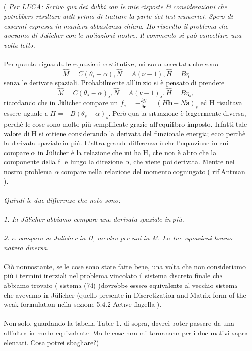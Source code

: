 \\\\\\\\
( \emph{Per LUCA: Scrivo qua dei dubbi con le mie risposte & considerazioni che potrebbero risultare utili prima di trattare la parte dei test numerici. Spero di essermi espressa in maniera abbastanza chiara. Ho riscritto il problema che avevamo di Julicher con le notiazioni nostre.
Il commento si può cancellare una volta letto.}
\\\\
Per quanto riguarda le equazioni costitutive, mi sono accertata che sono
\[ \hat{M} = C(\theta_s -\alpha), \hat{N} = A(\nu - 1), \hat{H} = B\eta \]
senza le derivate spaziali. Probabilmente all'inizio si è pensato di prendere 
\[ \hat{M} = C(\theta_s -\alpha)_s, \hat{N} = A(\nu - 1)_s, \hat{H} = B\eta _s, \] 
ricordando che in Jülicher compare un
$f_e = -\frac{\partial \mathcal{G}}{\partial \mathbf{r}} = (H \mathbf{b} + N \mathbf{a})_s$
ed H risultava essere uguale a $H = - B(\theta_s - \alpha)_s$. Però qua la situazione è leggermente diversa, perchè le cose sono molto più semplificate grazie all'equilibro imposto.
Infatti tale valore di H si ottiene considerando la derivata del funzionale energia; ecco perchè la derivata spaziale in più.
L'altra grande differenza è che l'equazione in cui compare $\alpha$ in Jülicher è la relazione che mi ha H, che non è altro che la componente della f_e lungo la direzione $\mathbf{b}$, che viene poi derivata. Mentre nel nostro problema $\alpha$ compare nella relazione del momento cogniugato ( rif.Antman ).
\\\\
\emph{Quindi le due differenze che noto sono:}
\\\\
\emph{1. In Jülicher abbiamo compare una derivata spaziale in più.}
\\\\
\emph{2. $\alpha$ compare in Julicher in H, mentre per noi in M. Le due equazioni hanno natura diversa.}
\\\\
Ciò nonnostante, se le cose sono state fatte bene, una volta che non consideriamo più i termini inerziali nel problema vincolato il sistema discreto finale che abbiamo trovato ( sistema (74) )dovrebbe essere equivalente al vecchio sistema che avevamo in Jülicher (quello presente in Discretization and Matrix form of the weak formulation nella sezione 5.4.2 Active flagella ).
\\\\
Non solo, guardando la tabella Table 1. di sopra, dovrei poter passare da una all'altra in modo equivalente. Ma le cose non mi tornanano per i due motivi sopra elencati. Cosa potrei sbagliare?) 




